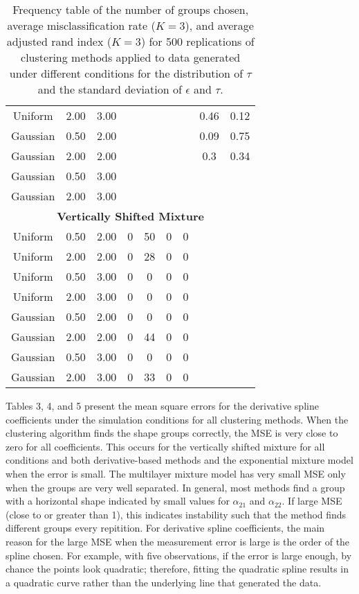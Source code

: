 \documentclass[12pt]{article}
\begin{document}
\begin{table}[ht]
\begin{center}
\begin{tabular}{ccc|cccccc}
  Uniform & 2.00 & 3.00 &  &  &  &  & 0.46 & 0.12 \\ 
  Gaussian & 0.50 & 2.00 &  &  &  &  & 0.09 & 0.75 \\ 
  Gaussian & 2.00 & 2.00 &  &  &  &  & 0.3 & 0.34 \\ 
  Gaussian & 0.50 & 3.00 &  &  &  &  &  &  \\ 
  Gaussian & 2.00 & 3.00 &  &  &  &  &  &  \\ 
   \multicolumn{9}{c}{\textbf{Vertically Shifted Mixture}}\\Uniform & 0.50 & 2.00 & 0 & 50 & 0 & 0 &  &  \\ 
  Uniform & 2.00 & 2.00 & 0 & 28 & 0 & 0 &  &  \\ 
  Uniform & 0.50 & 3.00 & 0 & 0 & 0 & 0 &  &  \\ 
  Uniform & 2.00 & 3.00 & 0 & 0 & 0 & 0 &  &  \\ 
  Gaussian & 0.50 & 2.00 & 0 & 0 & 0 & 0 &  &  \\ 
  Gaussian & 2.00 & 2.00 & 0 & 44 & 0 & 0 &  &  \\ 
  Gaussian & 0.50 & 3.00 & 0 & 0 & 0 & 0 &  &  \\ 
  Gaussian & 2.00 & 3.00 & 0 & 33 & 0 & 0 &  &  \\ 
   \hline\end{tabular}
\caption{Frequency table of the number of groups chosen, average misclassification rate ($K=3$), and average adjusted rand index ($K=3$) for 500 replications of clustering methods applied to data generated under different conditions for the distribution of $\tau$ and the standard deviation of $\epsilon$ and $\tau$.}
\label{fig:se}
\end{center}
\end{table}

Tables 3, 4, and 5 present the mean square errors for the derivative spline coefficients under the simulation conditions for all clustering methods. When the clustering algorithm finds the shape groups correctly, the MSE is very close to zero for all coefficients. This occurs for the vertically shifted mixture for all conditions and both derivative-based methods and the exponential mixture model when the error is small. The multilayer mixture model has very small MSE only when the groups are very well separated. In general, most methods find a group with a horizontal shape indicated by small values for $\alpha_{21}$ and $\alpha_{22}$. If large MSE (close to or greater than 1), this indicates instability such that the method finds different groups every repitition. For derivative spline coefficients, the main reason for the large MSE when the measurement error is large is the order of the spline chosen. For example, with five observations, if the error is large enough, by chance the points look quadratic; therefore, fitting the quadratic spline results in a quadratic curve rather than the underlying line that generated the data. 
\end{document}
